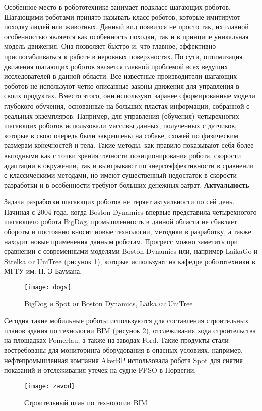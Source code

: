 Особенное место в робототехнике занимает подкласс шагающих роботов. Шагающими роботами принято называть класс роботов, которые имитируют походку людей или животных. Данный вид появился не просто так, их главной особенностью является как особенность походки, так и в принципе уникальная модель движения. Она позволяет быстро и, что главное, эффективно приспосабливаться к работе в неровных поверхностях\cite{movement_art}. По сути, оптимизация движения шагающих роботов является главной проблемой всех ведущих исследователей в данной области. Все известные производители шагающих роботов не используют четко описанные законы движения для управления в своих продуктах. Вместо этого, они используют заранее сформированные модели глубокого обучения, основанные на больших пластах информации, собранной с реальных экземпляров. Например, для управления (обучения) четырехногих шагающих роботов использовали массивы данных, полученных с датчиков, которые в свою очередь были закреплены на собаке, схожей по физическим размерам конечностей и тела\cite{dog_and_robo_dog}. Такие методы, как правило показывают себя более выгодными как с точки зрения точности позиционирования робота, скорости адаптации в окружении, так и выигрывают по энергоэффективности в сравнении с классическими методами, но имеют существенный недостаток в скорости разработки и в особенности требуют больших денежных затрат. 
\newpage
\textbf{Актуальность}


Задача разработки шагающих роботов не теряет актуальности по сей день. Начиная с 2004 года, когда Boston Dynamics впервые представила четырехногого шагающего робота BigDog, промышленность в данной области не сбавляет обороты и постоянно вносит новые технологии, методики в разработку, а также находит новые применения данным роботам. Прогресс можно заметить при сравнении с современными моделями Boston Dynamics или, например LaikaGo и Strelka от UniTree\cite{Laika}  (рисунок \ref{dogs}), которые используют на кафедре робототехники в МГТУ им. Н. Э Баумана.
\begin{figure}[h]
	\begin{center}
		\texttt{[image: dogs]}
		\caption{BigDog и Spot от Boston Dynamics, Laika от UniTree}
		\label{dogs}
	\end{center}
\end{figure}

Сегодня такие мобильные роботы используются для составления строительных планов здания по технологии BIM (рисунок \ref{zavod}), отслеживания хода строительства на площадках Pomerlau, а также на заводах Ford. Такие продукты стали востребованы для мониторинга оборудования в опасных условиях, например, нефтепромышленная компания AkerBP использовала робота Spot для снятия показаний и отслеживания утечек на судне FPSO в Норвегии\cite{fpso1,fpso2}.

\newpage
\begin{figure}[h]
	\begin{center}
		\texttt{[image: zavod]}
		\caption{Строительный план по технологии BIM}
		\label{zavod}
	\end{center}
\end{figure}